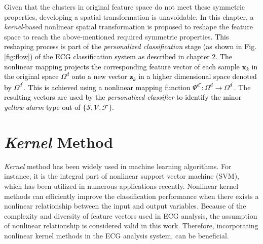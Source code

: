 Given that the clusters in original feature space do not meet these symmetric properties, developing a spatial transformation is unavoidable. In this chapter, a \textit{kernel}-based nonlinear spatial transformation is proposed to reshape the feature space to reach the above-mentioned required symmetric properties. 
\textcolor{black}{This reshaping process is part of the \textcolor{black}{\textit{personalized classification}} stage (as shown in Fig.\ref{fig:flow}) of the ECG classification system as described in chapter 2. The nonlinear mapping projects the corresponding feature vector of each sample $\mathbf{x}_k$  in the original space $\Omega^d$ onto a new vector $\mathbf{z}_k$ in a higher dimensional space denoted by $\Omega^{d^\prime}$.  This is achieved using a nonlinear mapping function $\Psi^{d'}:\Omega^{d} \rightarrow \Omega^{d^\prime}$. The resulting vectors are used by the \textit{personalized classifier} to identify the minor \textit{yellow alarm} type out of $\{\mathcal{S},\mathcal{V},\mathcal{F}\}$.} 

  

\section{\textit{Kernel} Method}

\textit{Kernel} method has been widely used in machine learning algorithms. For instance, it is the integral part of nonlinear support vector machine (SVM), which has been utilized in numerous applications recently\cite{shawe2004kernel}. Nonlinear kernel methods can efficiently improve the classification performance when there exists a nonlinear relationship between the input and output variables. Because of the complexity and diversity of feature vectors used in ECG analysis, the assumption of nonlinear relationship is considered valid in this work. Therefore, incorporating nonlinear kernel methods in the ECG analysis system, can be beneficial.

